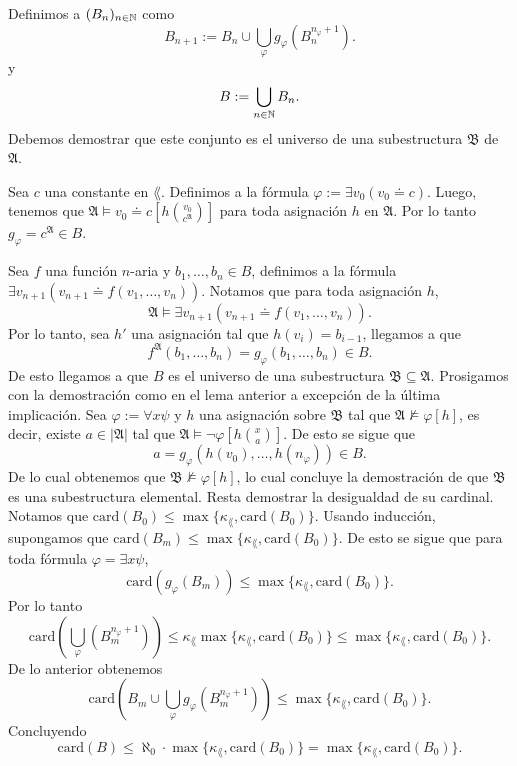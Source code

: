 Definimos a $(B_n)_{n \in \mathbb{N}}$ como
\[ B_{n+1} := B_n \cup \bigcup_{\varphi} g_\varphi \left(B_n^{n_\varphi + 1} \right). \]
y
\[ B := \bigcup_{n \in \mathbb{N}} B_n. \]
Debemos demostrar que este conjunto es el universo de una subestructura $\mathfrak{B}$ de $\mathfrak{A}$.

Sea $c$ una constante en $\lang$. 
Definimos a la f\'ormula $\varphi := \exists v_0 (v_0 \doteq c)$.
Luego, tenemos que $\mathfrak{A} \models v_0 \doteq c \left[ h \binom{v_0}{c^{\mathfrak{A}}} \right]$ para toda asignaci\'on $h$ en $\mathfrak{A}$.
Por lo tanto $g_{\varphi} = c^{\mathfrak{A}} \in B$.

Sea $f$ una funci\'on $n$-aria y $b_1, \dots, b_n \in B$, definimos a la f\'ormula $\exists v_{n+1} (v_{n+1} \doteq f(v_1, \dots, v_n))$.
Notamos que para toda asignaci\'on $h$,
\[ \mathfrak{A} \models \exists v_{n+1} (v_{n+1} \doteq f(v_1, \dots, v_n)). \]
Por lo tanto, sea $h'$ una asignaci\'on tal que $h(v_i) = b_{i-1}$, llegamos a que 
\[  f^{\mathfrak{A}} (b_1, \dots, b_n) = g_\varphi (b_1, \dots, b_n) \in B. \]
De esto llegamos a que $B$ es el universo de una subestructura $\mathfrak{B} \subseteq \mathfrak{A}$.
Prosigamos con la demostraci\'on como en el lema anterior a excepci\'on de la \'ultima implicaci\'on.
Sea $\varphi := \forall x \psi$ y $h$ una asignaci\'on sobre $\mathfrak{B}$ tal que $\mathfrak{A} \not\models \varphi [h]$, es decir, existe $a \in |\mathfrak{A}|$ tal que $\mathfrak{A} \models \neg \varphi \left[ h \binom{x}{a} \right]$.
De esto se sigue que 
\[ a = g_\varphi (h(v_0), \dots, h(n_{\varphi})) \in B. \]
De lo cual obtenemos que $\mathfrak{B} \not\models \varphi [h]$, lo cual concluye la demostraci\'on de que $\mathfrak{B}$ es una subestructura elemental.
\newpage
Resta demostrar la desigualdad de su cardinal.
Notamos que $\mathrm{card} (B_0) \leq \max \{ \kappa_\lang, \mathrm{card} (B_0) \}$.
Usando inducci\'on, supongamos que $\mathrm{card} (B_m) \leq \max \{ \kappa_\lang, \mathrm{card} (B_0) \}$.
De esto se sigue que para toda f\'ormula $\varphi = \exists x \psi$,
\[ \mathrm{card} (g_{\varphi} (B_m)) \leq \max \{ \kappa_\lang, \mathrm{card} (B_0) \}.  \]
Por lo tanto
\[ \mathrm{card} \left( \bigcup_{\varphi} (B_m^{n_\varphi + 1}) \right) \leq \kappa_\lang \max \{ \kappa_\lang, \mathrm{card} (B_0) \} \leq \max \{ \kappa_\lang, \mathrm{card} (B_0) \}. \]
De lo anterior obtenemos 
\[ \mathrm{card} \left( B_m \cup \bigcup_{\varphi} g_{\varphi} (B_m^{n_\varphi + 1}) \right) \leq \max \{ \kappa_\lang, \mathrm{card} (B_0) \}. \]
Concluyendo 
\[ \mathrm{card} (B) \leq \aleph_0 \cdot \max \{ \kappa_\lang, \mathrm{card} (B_0) \} = \max \{ \kappa_\lang, \mathrm{card} (B_0) \}.  \]

